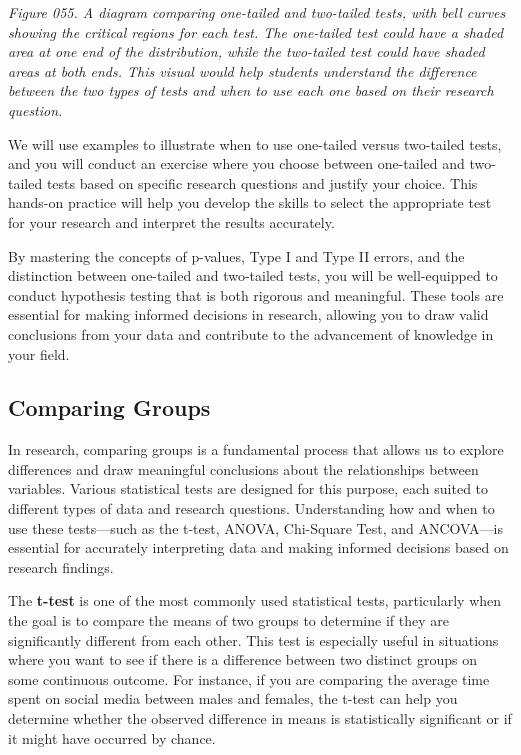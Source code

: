 \documentclass[
]{book}
\begin{document}
\emph{Figure 055. A diagram comparing one-tailed and two-tailed tests, with bell curves showing the critical regions for each test. The one-tailed test could have a shaded area at one end of the distribution, while the two-tailed test could have shaded areas at both ends. This visual would help students understand the difference between the two types of tests and when to use each one based on their research question.}

We will use examples to illustrate when to use one-tailed versus two-tailed tests, and you will conduct an exercise where you choose between one-tailed and two-tailed tests based on specific research questions and justify your choice. This hands-on practice will help you develop the skills to select the appropriate test for your research and interpret the results accurately.

By mastering the concepts of p-values, Type I and Type II errors, and the distinction between one-tailed and two-tailed tests, you will be well-equipped to conduct hypothesis testing that is both rigorous and meaningful. These tools are essential for making informed decisions in research, allowing you to draw valid conclusions from your data and contribute to the advancement of knowledge in your field.

\subsection{Comparing Groups}\label{comparing-groups}

In research, comparing groups is a fundamental process that allows us to explore differences and draw meaningful conclusions about the relationships between variables. Various statistical tests are designed for this purpose, each suited to different types of data and research questions. Understanding how and when to use these tests---such as the t-test, ANOVA, Chi-Square Test, and ANCOVA---is essential for accurately interpreting data and making informed decisions based on research findings.

The \textbf{t-test} is one of the most commonly used statistical tests, particularly when the goal is to compare the means of two groups to determine if they are significantly different from each other. This test is especially useful in situations where you want to see if there is a difference between two distinct groups on some continuous outcome. For instance, if you are comparing the average time spent on social media between males and females, the t-test can help you determine whether the observed difference in means is statistically significant or if it might have occurred by chance.
\end{document}
